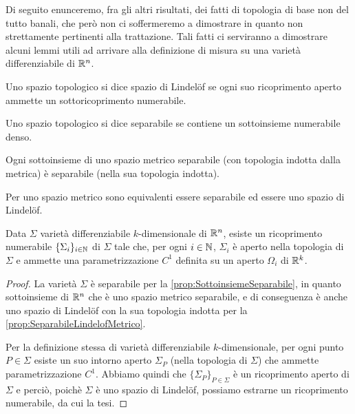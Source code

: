 Di seguito enunceremo, fra gli altri risultati, dei fatti di topologia di base non del tutto banali, che però non ci soffermeremo a dimostrare in quanto non strettamente pertinenti alla trattazione. Tali fatti ci serviranno a dimostrare alcuni lemmi utili ad arrivare alla definizione di misura su una varietà differenziabile di $\mathbb R^n$.

\begin{definition}
	Uno spazio topologico si dice spazio di Lindelöf se ogni suo ricoprimento aperto ammette un sottoricoprimento numerabile. 
\end{definition}

\begin{definition}
	Uno spazio topologico si dice separabile se contiene un sottoinsieme numerabile denso.
\end{definition}

\begin{proposition}\label{prop:SottoinsiemeSeparabile}
	Ogni sottoinsieme di uno spazio metrico separabile (con topologia indotta dalla metrica) è separabile (nella sua topologia indotta).
\end{proposition}

\begin{proposition}\label{prop:SeparabileLindelofMetrico}
	Per uno spazio metrico sono equivalenti essere separabile ed essere uno spazio di Lindelöf.
\end{proposition}

\begin{lemma}\label{lemma:SottovarietaUnioneNumerabile}
	Data $\Sigma$ varietà differenziabile $k$-dimensionale di $\mathbb R^n$, esiste un ricoprimento numerabile  $\{\Sigma_i\}_{i\in\mathbb N}$ di $\Sigma$ tale che, per ogni $i\in\mathbb N$, $\Sigma_i$ è aperto nella topologia di $\Sigma$ e ammette una parametrizzazione $C^1$ definita su un aperto $\Omega_i$ di $\mathbb R^k$.
\end{lemma}
\begin{proof}
	La varietà $\Sigma$ è separabile per la \cref{prop:SottoinsiemeSeparabile}, in quanto sottoinsieme di $\mathbb R^n$ che è uno spazio metrico separabile, e di conseguenza è anche uno spazio di Lindelöf con la sua topologia indotta per la \cref{prop:SeparabileLindelofMetrico}.
	
	Per la definizione stessa di varietà differenziabile $k$-dimensionale, per ogni punto $P\in\Sigma$ esiste un suo intorno aperto $\Sigma_P$ (nella topologia di $\Sigma$) che ammette parametrizzazione $C^1$. Abbiamo quindi che $\{\Sigma_P\}_{P\in\Sigma}$ è un ricoprimento aperto di $\Sigma$ e perciò, poichè $\Sigma$ è uno spazio di Lindelöf, possiamo estrarne un ricoprimento numerabile, da cui la tesi.
\end{proof}

